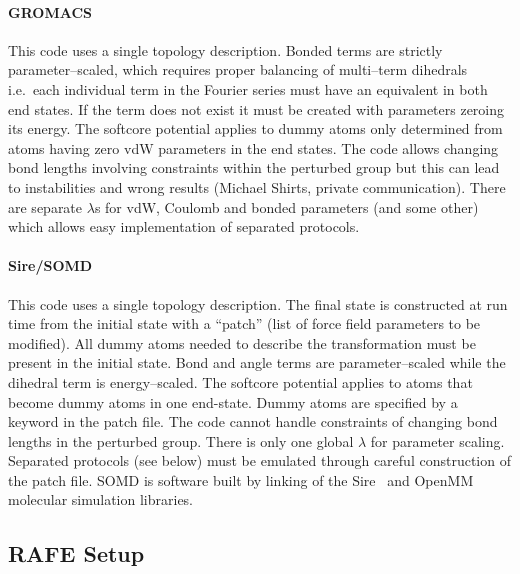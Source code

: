 \documentclass[journal=jctcce,manuscript=article]{achemso}
\begin{document}
\paragraph{GROMACS} This code uses a single topology description.
Bonded terms are strictly parameter--scaled, which requires proper
balancing of multi--term dihedrals i.e.\ each individual term in the Fourier 
series must have an equivalent in both end states.  If the term does not exist 
it must be created with parameters zeroing its energy.
The softcore potential applies to dummy 
atoms only determined from atoms having zero vdW parameters in the end states.
The code
allows changing bond lengths involving constraints within the perturbed group 
but this can lead to instabilities and wrong results (Michael Shirts,
private communication).  There are separate $\lambda$s for vdW,
Coulomb and bonded parameters (and some other) which allows easy implementation 
of separated protocols.

\paragraph{Sire/SOMD} This code uses a single topology description.
The final state is constructed at run time from the initial state with
a ``patch'' (list of force field parameters to be modified). All dummy atoms
needed to describe the transformation must be present in the initial state. 
Bond and
angle terms are parameter--scaled while the dihedral term is
energy--scaled.  The softcore potential applies to atoms that become dummy atoms
 in one end-state. Dummy atoms are specified by a keyword in the patch file.
The code cannot handle constraints of changing bond lengths in the
perturbed group.  There is only one global $\lambda$ for parameter
scaling.  Separated protocols (see below) must be emulated through
careful construction of the patch file.  SOMD is software built by linking of
the Sire~\cite{Sire-2016} and OpenMM~\cite{doi:10.1021/ct300857j} molecular
simulation libraries.


\subsection{RAFE Setup}
\label{sec:rafe_setup}
\end{document}
